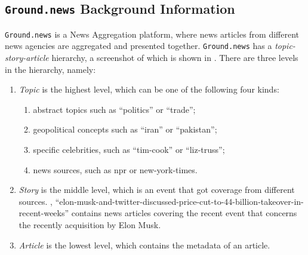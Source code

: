 \subsection{\texttt{Ground.news} Background Information}
\label{ground-news}
\texttt{Ground.news} is a News Aggregation platform, where news articles from different news agencies are aggregated and presented together. \texttt{Ground.news} has a \textit{topic-story-article} hierarchy, a screenshot of which is shown in . There are three levels in the hierarchy, namely:
\begin{enumerate}
    \item \textit{Topic} is the highest level, which can be one of the following four kinds:
    \begin{enumerate}
        \item abstract topics such as ``politics'' or ``trade'';
        \item geopolitical concepts such as ``iran'' or ``pakistan'';
        \item specific celebrities, such as ``tim-cook'' or ``liz-truss'';
        \item news sources, such as npr or new-york-times.
    \end{enumerate}
    \item \textit{Story} is the middle level, which is an event that got coverage from different sources. \Eg, ``elon-musk-and-twitter-discussed-price-cut-to-44-billion-takeover-in-recent-weeks'' contains news articles covering the recent event that concerns the recently acquisition by Elon Musk.
    \item \textit{Article} is the lowest level, which contains the metadata of an article.
\end{enumerate}
